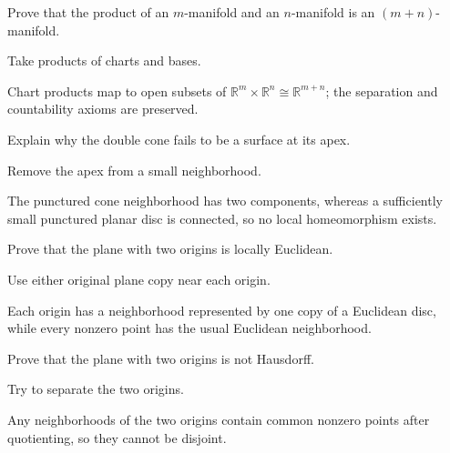 \begin{exercise}\label{exr:vii01-05}
Prove that the product of an \(m\)-manifold and an \(n\)-manifold is an \((m+n)\)-manifold.
\end{exercise}
\begin{hint}
Take products of charts and bases.
\end{hint}
\begin{solution}Chart products map to open subsets of \(\mathbb R^m\times\mathbb R^n\cong\mathbb R^{m+n}\); the separation and countability axioms are preserved.\end{solution}

\begin{exercise}\label{exr:vii01-06}
Explain why the double cone fails to be a surface at its apex.
\end{exercise}
\begin{hint}
Remove the apex from a small neighborhood.
\end{hint}
\begin{solution}The punctured cone neighborhood has two components, whereas a sufficiently small punctured planar disc is connected, so no local homeomorphism exists.\end{solution}

\begin{exercise}\label{exr:vii01-07}
Prove that the plane with two origins is locally Euclidean.
\end{exercise}
\begin{hint}
Use either original plane copy near each origin.
\end{hint}
\begin{solution}Each origin has a neighborhood represented by one copy of a Euclidean disc, while every nonzero point has the usual Euclidean neighborhood.\end{solution}

\begin{exercise}\label{exr:vii01-08}
Prove that the plane with two origins is not Hausdorff.
\end{exercise}
\begin{hint}
Try to separate the two origins.
\end{hint}
\begin{solution}Any neighborhoods of the two origins contain common nonzero points after quotienting, so they cannot be disjoint.\end{solution}

